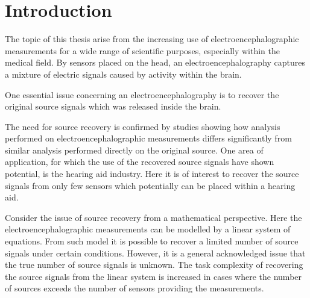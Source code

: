 \chapter*{Introduction}\label{ch:introduction}
%
%
The topic of this thesis arise from the increasing use of electroencephalographic measurements for a wide range of scientific purposes, especially within the medical field. 
By sensors placed on the head, an electroencephalography captures a mixture of electric signals caused by activity within the brain.   

One essential issue concerning an electroencephalography is to  
recover the original source signals which was released inside the brain. 
 
The need for source recovery is confirmed by studies showing how analysis performed on electroencephalographic measurements differs significantly from similar analysis performed directly on the original source\cite{Friston2002}.
One area of application, for which the use of the recovered source signals have shown potential, is the hearing aid industry. Here it is of interest to recover the source signals from only few sensors which potentially can be placed within a hearing aid.     

Consider the issue of source recovery from a mathematical perspective. Here the electroencephalographic measurements can be modelled by a linear system of equations. From such model it is possible to recover a limited number of source signals under certain conditions. However, it is a general acknowledged issue that the true number of source signals is unknown.
The task complexity of recovering the source signals from the linear system is increased in cases where the number of sources exceeds the number of sensors providing the measurements.

